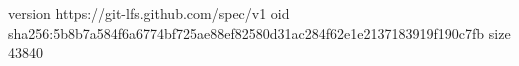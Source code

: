 version https://git-lfs.github.com/spec/v1
oid sha256:5b8b7a584f6a6774bf725ae88ef82580d31ac284f62e1e2137183919f190c7fb
size 43840
